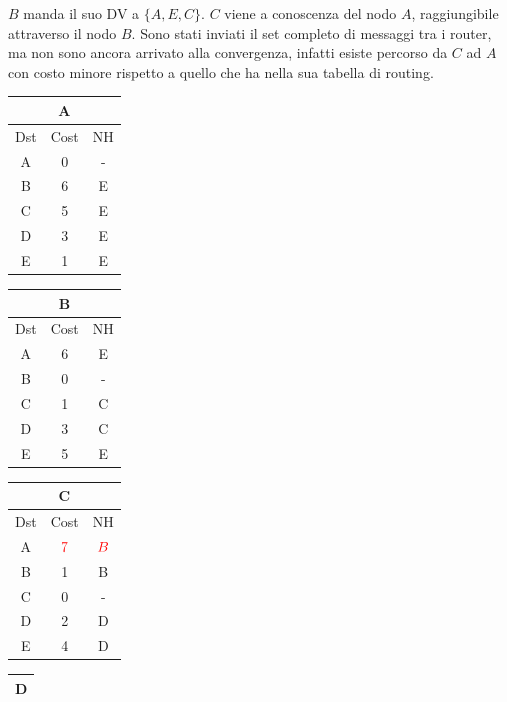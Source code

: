 \documentclass[10pt]{article}
\begin{document}
			\newline \newline
			$B$ manda il suo DV a $\{A,E,C\}$.
			\newline
			$C$ viene a conoscenza del nodo $A$, raggiungibile attraverso il nodo $B$.
			\newline
			Sono stati inviati il set completo di messaggi tra i router, ma non sono ancora arrivato alla convergenza, infatti esiste percorso da $C$ ad $A$ con costo minore rispetto a quello che ha nella sua tabella di routing.
			\begin{table}[h!]
				\begin{tabular}{|c||c||c|}
					\hline
					\multicolumn{3}{|c|}{A} \\
					\hline
					Dst & Cost & NH \\
					\hline
					A & 0 & - \\
					B & 6 & E \\
					C & 5 & E \\
					D & 3 & E \\
					E & 1 & E \\
					\hline
				\end{tabular}
				\begin{tabular}{|c||c||c|}
					\hline
					\multicolumn{3}{|c|}{B} \\
					\hline
					Dst & Cost & NH \\
					\hline
					A & 6 & E \\
					B & 0 & - \\
					C & 1 & C \\
					D & 3 & C \\
					E & 5 & E \\
					\hline
				\end{tabular}
				\begin{tabular}{|c||c||c|}
					\hline
					\multicolumn{3}{|c|}{C} \\
					\hline
					Dst & Cost & NH \\
					\hline
					A & $\color{red} 7$ & $\color{red} B$ \\
					B & 1 & B \\
					C & 0 & - \\
					D & 2 & D \\
					E & 4 & D \\
					\hline
				\end{tabular}
				\begin{tabular}{|c||c||c|}
					\hline
					\multicolumn{3}{|c|}{D} \\
					\hline

\end{tabular}
\end{table}
\end{document}
